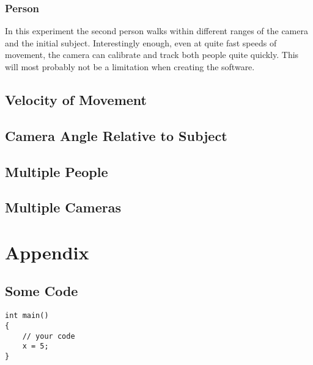 \documentclass[10pt]{article}
\begin{document}
\subsubsection{Person}
\noindent
In this experiment the second person walks within different ranges of the camera and the initial subject. Interestingly enough, even at quite fast speeds of movement, the camera can calibrate and track both people quite quickly. This will most probably not be a limitation when creating the software. 
\subsection{Velocity of Movement}


\subsection{Camera Angle Relative to Subject}


\subsection{Multiple People}


\subsection{Multiple Cameras}
\clearpage

\section*{Appendix}
\subsection*{Some Code}
\begin{lstlisting}
int main()
{
	// your code
	x = 5;
}

\end{lstlisting}
\end{document}
